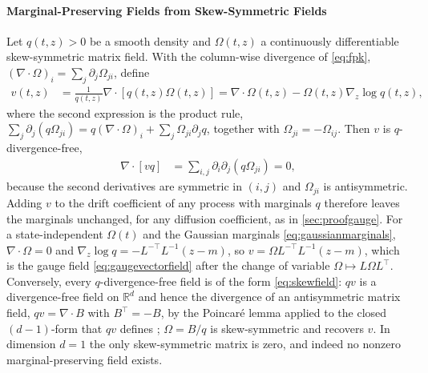 \documentclass{article} %
\newcommand{\gauge}{\Omega}
\newcommand{\reals}{\mathbb{R}}
\begin{document}
\paragraph{Marginal-Preserving Fields from Skew-Symmetric Fields}
Let $q(t, z) > 0$ be a smooth density and $\gauge(t, z)$ a continuously differentiable skew-symmetric matrix field. With the column-wise divergence of \cref{eq:fpk}, $(\nabla \cdot \gauge)_i = \sum_j \partial_j \gauge_{ji}$, define
\begin{align}
    v(t, z) &= \frac{1}{q(t, z)} \nabla \cdot \left[ q(t, z) \gauge(t, z) \right] = \nabla \cdot \gauge(t, z) - \gauge(t, z) \nabla_z \log q(t, z), \label{eq:skewfield}
\end{align}
where the second expression is the product rule, $\sum_j \partial_j (q \gauge_{ji}) = q (\nabla \cdot \gauge)_i + \sum_j \gauge_{ji} \partial_j q$, together with $\gauge_{ji} = -\gauge_{ij}$. Then $v$ is $q$-divergence-free,
\begin{align*}
    \nabla \cdot [v q] &= \sum_{i, j} \partial_i \partial_j \left( q \gauge_{ji} \right) = 0,
\end{align*}
because the second derivatives are symmetric in $(i, j)$ and $\gauge_{ji}$ is antisymmetric. Adding $v$ to the drift coefficient of any process with marginals $q$ therefore leaves the marginals unchanged, for any diffusion coefficient, as in \cref{sec:proofgauge}. For a state-independent $\gauge(t)$ and the Gaussian marginals \cref{eq:gaussianmarginals}, $\nabla \cdot \gauge = 0$ and $\nabla_z \log q = -L^{-\top} L^{-1}(z - m)$, so $v = \gauge L^{-\top} L^{-1}(z - m)$, which is the gauge field \cref{eq:gaugevectorfield} after the change of variable $\gauge \mapsto L \gauge L^\top$. Conversely, every $q$-divergence-free field is of the form \cref{eq:skewfield}: $q v$ is a divergence-free field on $\reals^d$ and hence the divergence of an antisymmetric matrix field, $q v = \nabla \cdot B$ with $B^\top = -B$, by the Poincar\'e lemma applied to the closed $(d-1)$-form that $q v$ defines \citep[Chapter 17]{lee2012smooth}; $\gauge = B / q$ is skew-symmetric and recovers $v$. In dimension $d = 1$ the only skew-symmetric matrix is zero, and indeed no nonzero marginal-preserving field exists.
\end{document}
